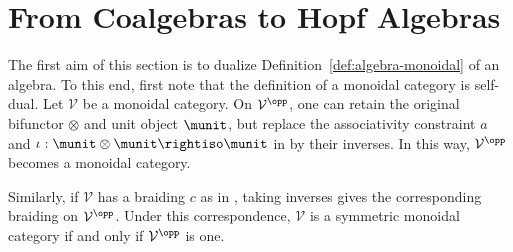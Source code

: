 
\section{From Coalgebras to Hopf Algebras}\label{sec:bialgebra}
\hypertarget{o014.aljabr2.chapter7.coalgebra-to-hopf-a}{ }
The first aim of this section is to dualize
Definition~\ref{def:algebra-monoidal} of an algebra. To this end, first note
that the definition of a monoidal category is self-dual. Let $\mathcal{V}$ be
a monoidal category. On $\mathcal{V}^{\opp}$, one can retain the original
bifunctor $\otimes$ and unit object $\munit$, but replace the associativity
constraint $a$ and $\iota:\munit\otimes\munit\rightiso\munit$ in
\cite[Definition 3.1.1]{Li1} by their inverses. In this way,
$\mathcal{V}^{\opp}$ becomes a monoidal category.

Similarly, if $\mathcal{V}$ has a braiding $c$ as in
\cite[Definition 3.3.1]{Li1}, taking inverses gives the corresponding
braiding on $\mathcal{V}^{\opp}$. Under this correspondence, $\mathcal{V}$ is
a symmetric monoidal category if and only if $\mathcal{V}^{\opp}$ is one.

